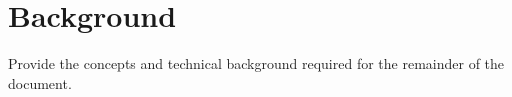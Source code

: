 \section{Background}
\label{sec:background}

Provide the concepts and technical background required for the remainder of the document.
